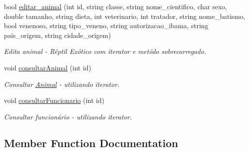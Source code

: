 \begin{DoxyCompactItemize}
bool \mbox{\hyperlink{class_sistema_a62bed38c08140063ae833bffa9f7d422}{editar\+\_\+animal}} (int id, string classe, string nome\+\_\+cientifico, char sexo, double tamanho, string dieta, int veterinario, int tratador, string nome\+\_\+batismo, bool venenoso, string tipo\+\_\+veneno, string autorizacao\+\_\+ibama, string pais\+\_\+origem, string cidade\+\_\+origem)
\begin{DoxyCompactList}\small\item\em Edita animal -\/ Réptil Exótico com iterator e metódo sobrecarregado. \end{DoxyCompactList}\item 
\mbox{\label{class_sistema_a30ae8c31aee6eaa58a8114c92ec56f9d}} 
void \mbox{\hyperlink{class_sistema_a30ae8c31aee6eaa58a8114c92ec56f9d}{consultar\+Animal}} (int id)
\begin{DoxyCompactList}\small\item\em Consultar \mbox{\hyperlink{class_animal}{Animal}} -\/ utilizando iterator. \end{DoxyCompactList}\item 
\mbox{\label{class_sistema_a76a0194e816767c0ace739eca298b03b}} 
void \mbox{\hyperlink{class_sistema_a76a0194e816767c0ace739eca298b03b}{consultar\+Funcionario}} (int id)
\begin{DoxyCompactList}\small\item\em Consultar funcionário -\/ utilizando iterator. \end{DoxyCompactList}\end{DoxyCompactItemize}


\subsection{Member Function Documentation}
\mbox{\label{class_sistema_a5435a4ad49076bda8dd91387093b9268}} 
